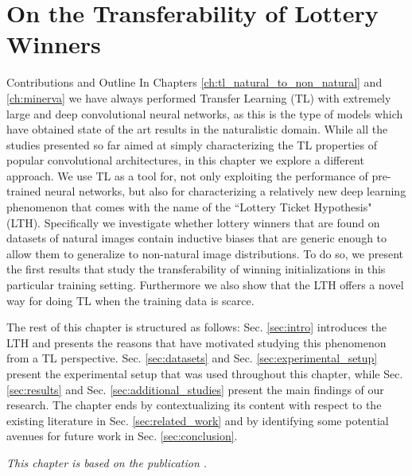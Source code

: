 
\chapter{On the Transferability of Lottery Winners} %
\label{ch:tl_lth} %

\begin{remark}{Contributions and Outline}
	In Chapters \ref{ch:tl_natural_to_non_natural} and \ref{ch:minerva} we have always performed Transfer Learning (TL) with extremely large and deep convolutional neural networks, as this is the type of models which have obtained state of the art results in the naturalistic domain. While all the studies presented so far aimed at simply characterizing the TL properties of popular convolutional architectures, in this chapter we explore a different approach. We use TL as a tool for, not only exploiting the performance of pre-trained neural networks, but also for characterizing a relatively new deep learning phenomenon that comes with the name of the ``Lottery Ticket Hypothesis" (LTH). Specifically we investigate whether lottery winners that are found on datasets of natural images contain inductive biases that are generic enough to allow them to generalize to non-natural image distributions. To do so, we present the first results that study the transferability of winning initializations in this particular training setting. Furthermore we also show that the LTH offers a novel way for doing TL when the training data is scarce. 

The rest of this chapter is structured as follows: Sec. \ref{sec:intro} introduces the LTH and presents the reasons that have motivated studying this phenomenon from a TL perspective. Sec. \ref{sec:datasets} and Sec. \ref{sec:experimental_setup} present the experimental setup that was used throughout this chapter, while Sec. \ref{sec:results} and Sec. \ref{sec:additional_studies} present the main findings of our research. The chapter ends by contextualizing its content with respect to the existing literature in Sec. \ref{sec:related_work} and by identifying some potential avenues for future work in Sec. \ref{sec:conclusion}.

\vspace{5mm}
\textit{This chapter is based on the publication \citet{sabatelli2020transferability}.}

\end{remark}

